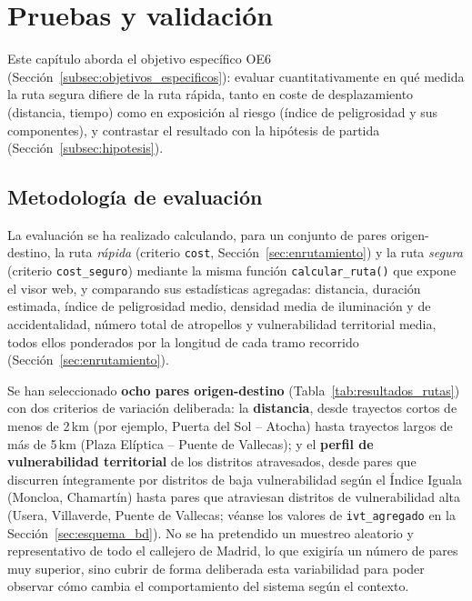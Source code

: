 \chapter{Pruebas y validación}
\label{cap:pruebas}

Este capítulo aborda el objetivo específico OE6 (Sección~\ref{subsec:objetivos_especificos}): evaluar cuantitativamente en qué medida la ruta segura difiere de la ruta rápida, tanto en coste de desplazamiento (distancia, tiempo) como en exposición al riesgo (índice de peligrosidad y sus componentes), y contrastar el resultado con la hipótesis de partida (Sección~\ref{subsec:hipotesis}).

\section{Metodología de evaluación}
\label{sec:metodologia_evaluacion}

La evaluación se ha realizado calculando, para un conjunto de pares origen-destino, la ruta \textit{rápida} (criterio \texttt{cost}, Sección~\ref{sec:enrutamiento}) y la ruta \textit{segura} (criterio \texttt{cost\_seguro}) mediante la misma función \texttt{calcular\_ruta()} que expone el visor web, y comparando sus estadísticas agregadas: distancia, duración estimada, índice de peligrosidad medio, densidad media de iluminación y de accidentalidad, número total de atropellos y vulnerabilidad territorial media, todos ellos ponderados por la longitud de cada tramo recorrido (Sección~\ref{sec:enrutamiento}).

Se han seleccionado \textbf{ocho pares origen-destino} (Tabla~\ref{tab:resultados_rutas}) con dos criterios de variación deliberada: la \textbf{distancia}, desde trayectos cortos de menos de 2\,km (por ejemplo, Puerta del Sol -- Atocha) hasta trayectos largos de más de 5\,km (Plaza Elíptica -- Puente de Vallecas); y el \textbf{perfil de vulnerabilidad territorial} de los distritos atravesados, desde pares que discurren íntegramente por distritos de baja vulnerabilidad según el Índice Iguala (Moncloa, Chamartín) hasta pares que atraviesan distritos de vulnerabilidad alta (Usera, Villaverde, Puente de Vallecas; véanse los valores de \texttt{ivt\_agregado} en la Sección~\ref{sec:esquema_bd}). No se ha pretendido un muestreo aleatorio y representativo de todo el callejero de Madrid, lo que exigiría un número de pares muy superior, sino cubrir de forma deliberada esta variabilidad para poder observar cómo cambia el comportamiento del sistema según el contexto.

